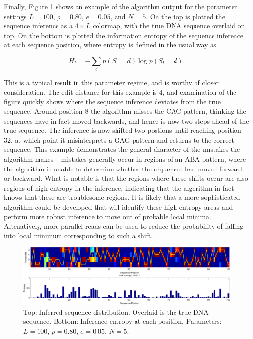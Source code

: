 \documentclass[12pt]{article}
\begin{document}
Finally, Figure \ref{fig:example_inference} shows an example of the algorithm output for the parameter settings $L=100$, $p=0.80$, $e=0.05$, and $N=5$.
On the top is plotted the sequence inference as a $4\times L$ colormap, with the true DNA sequence overlaid on top.
On the bottom is plotted the information entropy of the sequence inference at each sequence position, where entropy is defined in the usual way as

\begin{equation}
H_l = -\displaystyle\sum_{d}p(S_l=d)\log p(S_l=d).
\end{equation}

This is a typical result in this parameter regime, and is worthy of closer consideration.
The edit distance for this example is 4, and examination of the figure quickly shows where the sequence inference deviates from the true sequence.
Around position 8 the algorithm misses the CAC pattern, thinking the sequences have in fact moved backwards, and hence is now two steps ahead of the true sequence.
The inference is now shifted two postions until reaching position 32, at which point it misinterprets a GAG pattern and returns to the correct sequence.
This example demonstrates the general character of the mistakes the algorithm makes -- mistakes generally occur in regions of an ABA pattern, where the algorithm is unable to determine whether the sequences had moved forward or backward.
What is notable is that the regions where these shifts occur are also regions of high entropy in the inference, indicating that the algorithm in fact knows that these are troublesome regions.
It is likely that a more sophisticated algorithm could be developed that will identify these high entropy areas and perform more robust inference to move out of probable local minima.
Altenatively, more parallel reads can be used to reduce the probability of falling into local minimum corresponding to such a shift. 

\begin{figure}
\centering
\includegraphics[width=1\textwidth]{fig/example_inference.pdf}
\caption{Top: Inferred sequence distribution. Overlaid is the true DNA sequence. Bottom: Inference entropy at each position. Parameters: $L=100$, $p=0.80$, $e=0.05$, $N=5$.}
\label{fig:example_inference}
\end{figure}
\end{document}
